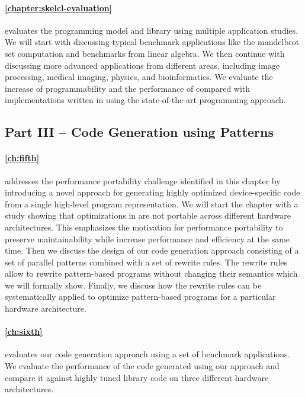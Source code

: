 \paragraph{\autoref{chapter:skelcl-evaluation}} evaluates the \SkelCL programming model and library using multiple application studies.
We will start with discussing typical benchmark applications like the mandelbrot set computation and benchmarks from linear algebra.
We then continue with discussing more advanced applications from different areas, including image processing, medical imaging, physics, and bioinformatics.
We evaluate the increase of programmability and the performance of \SkelCL compared with implementations written in using the state-of-the-art \OpenCL programming approach.


\subsection*{Part III -- Code Generation using Patterns}

\paragraph{\autoref{ch:fifth}} addresses the performance portability challenge identified in this chapter by introducing a novel approach for generating highly optimized device-specific code from a single high-level program representation.
We will start the chapter with a study showing that optimizations in \OpenCL are not portable across different hardware architectures.
This emphasizes the motivation for performance portability to preserve maintainability while increase performance and efficiency at the same time.
Then we discuss the design of our code generation approach consisting of a set of parallel patterns combined with a set of rewrite rules.
The rewrite rules allow to rewrite pattern-based programs without changing their semantics which we will formally show.
Finally, we discuss how the rewrite rules can be systematically applied to optimize pattern-based programs for a particular hardware architecture.

\paragraph{\autoref{ch:sixth}} evaluates our code generation approach using a set of benchmark applications.
We evaluate the performance of the code generated using our approach and compare it against highly tuned library code on three different hardware architectures.

